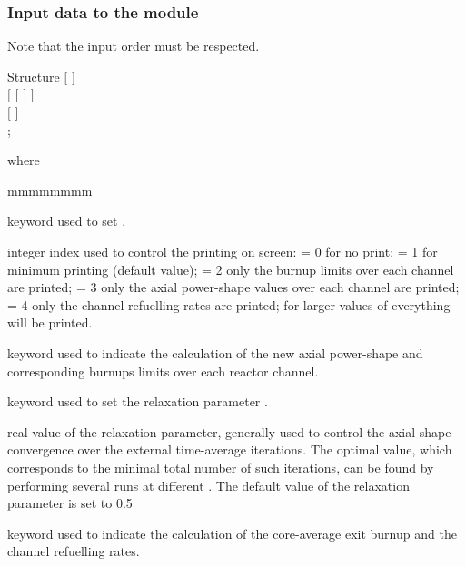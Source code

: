 \vskip 0.2cm
\subsubsection{Input data to the  module}\label{sect:strtavg}

\noindent
Note that the input order must be respected. \\

\begin{DataStructure}{Structure }
$[$   $]$ \\
$[$  $[$   $]$ $]$ \\
$[$  $]$ \\
 ;
\end{DataStructure}

\noindent where
\begin{ListeDeDescription}{mmmmmmmm}

\item[\moc{EDIT}] keyword used to set .

\item[\dusa{iprint}] integer index used to control the printing on screen:
 = 0 for no print; = 1 for minimum printing (default value); = 2 only the burnup limits
over each channel are printed; = 3 only the axial power-shape values over each channel
are printed; = 4 only the channel refuelling rates are printed; for larger values of
 everything will be printed.

\item[\moc{AX-SHAPE}] keyword used to indicate the calculation of the new
axial power-shape and corresponding burnups limits over each reactor channel.

\item[\moc{RELAX}] keyword used to set the relaxation parameter .

\item[\dusa{relval}] real value of the relaxation parameter, generally used to
control the axial-shape convergence over the external time-average iterations.
The optimal value, which corresponds to the minimal total number of such iterations,
can be found by performing several runs at different . The default
value of the relaxation parameter is set to 0.5

\item[\moc{B-EXIT}] keyword used to indicate the calculation of the core-average
exit burnup and the channel refuelling rates.

\end{ListeDeDescription}

